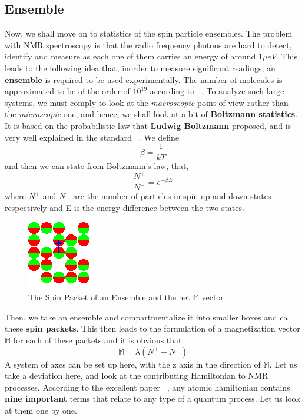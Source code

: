 \documentclass[12pt]{article}
\begin{document}
\subsection{Ensemble}
Now, we shall move on to statistics of the spin particle ensembles. The problem with NMR spectroscopy is that the radio frequency photons are hard to detect, identify and measure as each one of them carries an energy of around $1\mu eV$. This leads to the following idea that, inorder to measure significant readings, an \textbf{ensemble} is required to be used experimentally. The number of molecules is approximated to be of the order of $10^{19}$ according to ~\cite{JAJ}. To analyze such large systems, we must comply to look at the \textit{macroscopic} point of view rather than the \textit{microscopic} one, and hence, we shall look at a bit of \textbf{Boltzmann statistics}. It is based on the probabilistic law that \textbf{Ludwig Boltzmann} proposed, and is very well explained in the standard ~\cite{Feyn}. We define $$\beta = \frac{1}{kT}$$ and then we can state from Boltzmann's law, that, 
$$\frac{N^{+}}{N^{-}} = e^{-\beta E}$$ where $N^+$ and $N^-$ are the number of particles in spin up and down states respectively and E is the energy difference between the two states. 
\begin{figure}
\begin{center}
\includegraphics[scale=1]{ens1.png}
\end{center}
\caption{The Spin Packet of an Ensemble and the net $\mathbb{M}$ vector}
\end{figure}
Then, we take an ensemble and compartmentalize it into smaller boxes and call these \textbf{spin packets}. This then leads to the formulation of a magnetization vector $\mathbb{M}$ for each of these packets and it is obvious that $$\mathbb{M} =  \lambda (N^+ - N^-)$$ A system of axes can be set up here, with the z axis in the direction of $\mathbb{M}$. Let us take a deviation here, and look at the contributing Hamiltonian to NMR processes. According to the excellent paper ~\cite{ohio}, any atomic hamiltonian contains \textbf{nine important} terms that relate to any type of a quantum process. Let us look at them one by one. 
\clearpage
\end{document}
